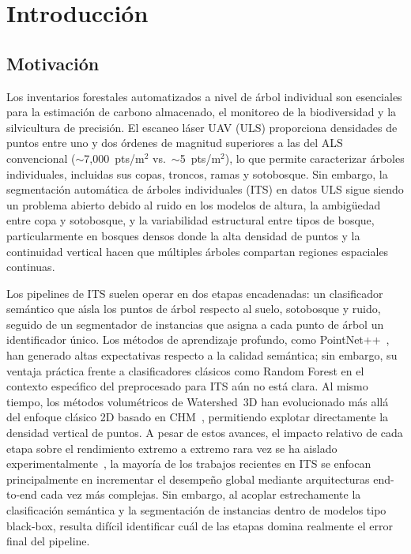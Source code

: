 \documentclass[runningheads]{llncs}
\begin{document}
\section{Introducci\'on}\label{sec:intro}

\subsection{Motivaci\'on}

Los inventarios forestales automatizados a nivel de \'arbol individual son esenciales para la estimaci\'on de carbono almacenado, el monitoreo de la biodiversidad y la silvicultura de precisi\'on. El escaneo l\'aser UAV (ULS) proporciona densidades de puntos entre uno y dos \'ordenes de magnitud superiores a las del ALS convencional ($\sim$7{,}000~pts/m$^2$ vs.\ $\sim$5~pts/m$^2$), lo que permite caracterizar \'arboles individuales, incluidas sus copas, troncos, ramas y sotobosque. Sin embargo, la segmentaci\'on autom\'atica de \'arboles individuales (ITS) en datos ULS sigue siendo un problema abierto debido al ruido en los modelos de altura, la ambig\"uedad entre copa y sotobosque, y la variabilidad estructural entre tipos de bosque, particularmente en bosques densos donde la alta densidad de puntos y la continuidad vertical hacen que múltiples árboles compartan regiones espaciales continuas.



Los pipelines de ITS suelen operar en dos etapas encadenadas: un clasificador sem\'antico que a\'\i{}sla los puntos de \'arbol respecto al suelo, sotobosque y ruido, seguido de un segmentador de instancias que asigna a cada punto de \'arbol un identificador \'unico. Los m\'etodos de aprendizaje profundo, como PointNet++~\cite{qi2017}, han generado altas expectativas respecto a la calidad sem\'antica; sin embargo, su ventaja pr\'actica frente a clasificadores cl\'asicos como Random Forest en el contexto espec\'\i{}fico del preprocesado para ITS a\'un no est\'a clara. Al mismo tiempo, los m\'etodos volum\'etricos de Watershed~3D han evolucionado m\'as all\'a del enfoque cl\'asico 2D basado en CHM~\cite{dalponte2016}, permitiendo explotar directamente la densidad vertical de puntos. A pesar de estos avances, el impacto relativo de cada etapa sobre el rendimiento extremo a extremo rara vez se ha aislado experimentalmente~\cite{qi2017,breiman2001,puliti2023}, la mayoría de los trabajos recientes en ITS se enfocan principalmente en incrementar el desempeño global mediante arquitecturas end-to-end cada vez más complejas. Sin embargo, al acoplar estrechamente la clasificación semántica y la segmentación de instancias dentro de modelos tipo black-box, resulta difícil identificar cuál de las etapas domina realmente el error final del pipeline.
\end{document}
